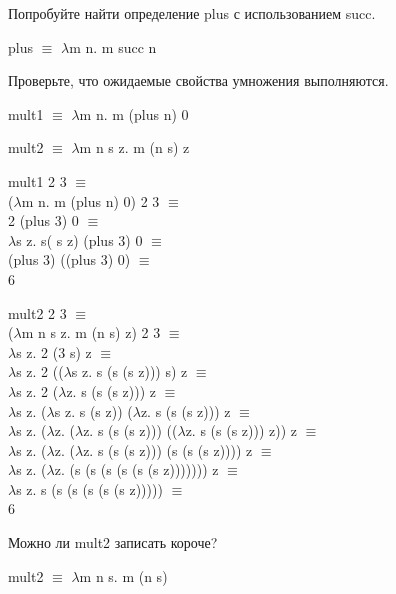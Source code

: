 \documentclass[a4paper,12pt]{article} %
\begin{document}
\begin{enumerate}

{\item Попробуйте найти определение plus с использованием succ.}

\begin{adjustwidth}{1em}{0pt}
plus $\equiv$ $\lambda$m n. m succ n
    \end{adjustwidth}

{\item Проверьте, что ожидаемые свойства умножения выполняются.}

mult1 $\equiv$ $\lambda$m n. m (plus n) 0

mult2 $\equiv$ $\lambda$m n s z. m (n s) z
    
\begin{adjustwidth}{1em}{0pt}
mult1 2 3 $\equiv$ \\
    ($\lambda$m n. m (plus n) 0) 2 3 $\equiv$ \\
    2 (plus 3) 0 $\equiv$ \\
    $\lambda$s z. s( s z) (plus 3) 0 $\equiv$ \\
    (plus 3) ((plus 3) 0) $\equiv$ \\
    6
    
    mult2 2 3 $\equiv$ \\
    ($\lambda$m n s z. m (n s) z) 2 3 $\equiv$ \\
    $\lambda$s z. 2 (3 s) z $\equiv$ \\
    $\lambda$s z. 2 (($\lambda$s z. s (s (s z))) s) z $\equiv$ \\
    $\lambda$s z. 2 ($\lambda$z. s (s (s z))) z $\equiv$ \\
    $\lambda$s z. ($\lambda$s z. s (s z)) ($\lambda$z. s (s (s z))) z $\equiv$ \\
    $\lambda$s z. ($\lambda$z. ($\lambda$z. s (s (s z))) (($\lambda$z. s (s (s z))) z)) z $\equiv$ \\
    $\lambda$s z. ($\lambda$z. ($\lambda$z. s (s (s z))) (s (s (s z)))) z $\equiv$ \\
    $\lambda$s z. ($\lambda$z. (s (s (s (s (s (s z))))))) z $\equiv$ \\
    $\lambda$s z. s (s (s (s (s (s z))))) $\equiv$ \\
    6
    \end{adjustwidth}

{\item Можно ли mult2 записать короче?}

\begin{adjustwidth}{1em}{0pt}
mult2 $\equiv$ $\lambda$m n s. m (n s)
    \end{adjustwidth}

\end{enumerate}
\end{document}
